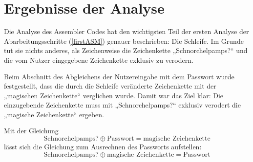 \documentclass{scrartcl}
\begin{document}
\section{Ergebnisse der Analyse}

Die Analyse des Assembler Codes hat den wichtigsten Teil der ersten Analyse der Abarbeitungsschritte (\autoref{firstASM}) genauer beschrieben: Die Schleife. Im Grunde tut sie nichts anderes, als Zeichenweise die Zeichenkette „Schnorchelpamps?“ und die vom Nutzer eingegebene Zeichenkette exklusiv zu verodern.

Beim Abschnitt des Abgleichens der Nutzereingabe mit dem Passwort wurde festgestellt, dass die durch die Schleife veränderte Zeichenkette mit der „magischen Zeichenkette“ verglichen wurde. Damit war das Ziel klar: Die einzugebende Zeichenkette muss mit „Schnorchelpamps?“ exklusiv verodert die „magische Zeichenkette“ ergeben.

\begin{table}[!ht]
\caption{Vergleich „Schnorchelpamps?“ mit der magischen/gewünschten Zeichenkette.}
\label{goal}
\end{table}

\noindent Mit der Gleichung
$$\text{Schnorchelpamps?} \oplus \text{Passwort} = \text{magische Zeichenkette} $$
lässt sich die Gleichung zum Ausrechnen des Passworts aufstellen:
$$\text{Schnorchelpamps?} \oplus \text{magische Zeichenkette} = \text{Passwort}$$
\end{document}
